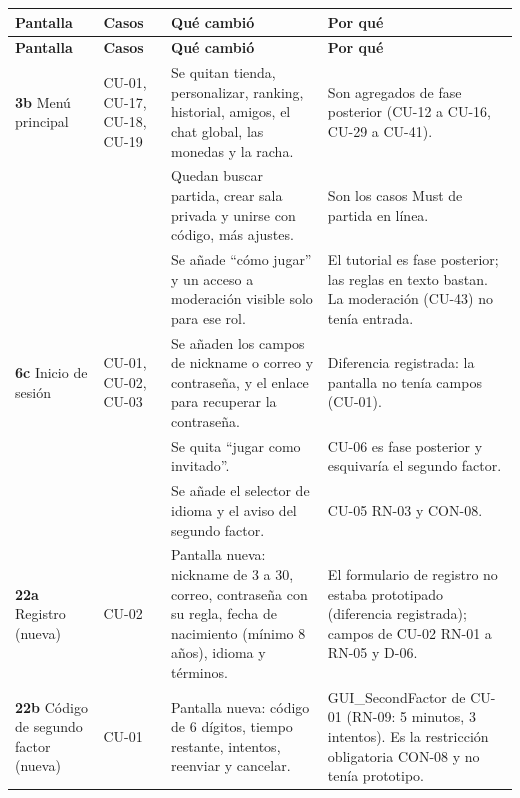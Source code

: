 \begin{center}\small
\begin{longtable}{|L{0.1\textwidth}|L{0.13\textwidth}|L{0.335\textwidth}|L{0.32\textwidth}|}
\hline
\textbf{Pantalla} & \textbf{Casos} & \textbf{Qué cambió} & \textbf{Por qué} \\ \hline
\endfirsthead
\hline
\textbf{Pantalla} & \textbf{Casos} & \textbf{Qué cambió} & \textbf{Por qué} \\ \hline
\endhead
\textbf{3b} Menú principal & \mbox{CU-01}, \mbox{CU-17}, \mbox{CU-18}, \mbox{CU-19} & Se quitan tienda, personalizar, ranking, historial, amigos, el chat global, las monedas y la racha. & Son agregados de fase posterior (\mbox{CU-12} a \mbox{CU-16}, \mbox{CU-29} a \mbox{CU-41}). \\ 
 &  & Quedan buscar partida, crear sala privada y unirse con código, más ajustes. & Son los casos Must de partida en línea. \\ 
 &  & Se añade ``cómo jugar'' y un acceso a moderación visible solo para ese rol. & El tutorial es fase posterior; las reglas en texto bastan. La moderación (\mbox{CU-43}) no tenía entrada. \\ \hline
\textbf{6c} Inicio de sesión & \mbox{CU-01}, \mbox{CU-02}, \mbox{CU-03} & Se añaden los campos de nickname o correo y contraseña, y el enlace para recuperar la contraseña. & Diferencia registrada: la pantalla no tenía campos (\mbox{CU-01}). \\ 
 &  & Se quita ``jugar como invitado''. & \mbox{CU-06} es fase posterior y esquivaría el segundo factor. \\ 
 &  & Se añade el selector de idioma y el aviso del segundo factor. & \mbox{CU-05} \mbox{RN-03} y \mbox{CON-08}. \\ \hline
\textbf{22a} Registro (nueva) & \mbox{CU-02} & Pantalla nueva: nickname de 3 a 30, correo, contraseña con su regla, fecha de nacimiento (mínimo 8 años), idioma y términos. & El formulario de registro no estaba prototipado (diferencia registrada); campos de \mbox{CU-02} \mbox{RN-01} a \mbox{RN-05} y \mbox{D-06}. \\ \hline
\textbf{22b} Código de segundo factor (nueva) & \mbox{CU-01} & Pantalla nueva: código de 6 dígitos, tiempo restante, intentos, reenviar y cancelar. & GUI\_SecondFactor de \mbox{CU-01} (\mbox{RN-09}: 5 minutos, 3 intentos). Es la restricción obligatoria \mbox{CON-08} y no tenía prototipo. \\ \hline

\end{longtable}
\end{center}
